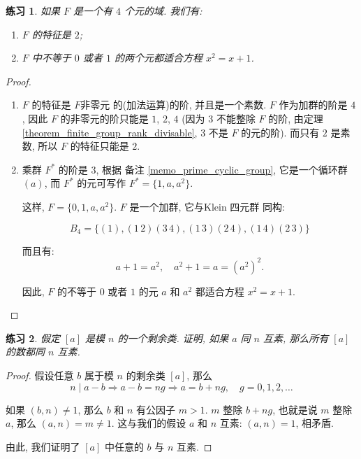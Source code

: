 \documentclass[utf8]{ctexbook}
\newtheorem{exercise}{练习}[section]
\begin{document}
\begin{exercise}
如果 $F$ 是一个有  $4$ 个元的域. 我们有:
\begin{enumerate}
\item{$F$ 的特征是 $2$;}
\item{$F$ 中不等于 $0$ 或者 $1$ 的两个元都适合方程 $x^2 = x + 1 $.}
\end{enumerate}
\end{exercise}

\begin{proof}
\begin{enumerate}
\item{$F$ 的特征是 $F$非零元 的(加法运算)的阶, 并且是一个素数. $F$ 作为加群的阶是 $4$, 因此 $F$ 的非零元的阶只能是 $1$, $2$, $4$ (因为 $3$ 不能整除 $F$ 的阶, 由定理 \ref{theorem_finite_group_rank_divisable}, $3$ 不是 $F$ 的元的阶). 而只有 $2$ 是素数, 所以 $F$ 的特征只能是 $2$.}
\item{乘群 $F^*$ 的阶是 $3$, 根据 备注 \ref{memo_prime_cyclic_group}, 它是一个循环群 $(a)$, 而 $F^*$ 的元可写作 $F^* = \{1, a, a^2 \}$.

这样, $F = \{0, 1, a, a^2 \}$. $F$ 是一个加群, 它与Klein 四元群 同构:

$$B_4 = \{ (1), (1\, 2)(3 \, 4), (1\, 3)(2 \, 4), (1\, 4) (2 \, 3) \} $$

而且有:
\begin{equation}
a + 1 = a^2, \quad a^2 + 1 = a = (a^2)^2.
\end{equation}

因此, $F$ 的不等于 $0$ 或者 $1$ 的元 $a$ 和 $a^2$ 都适合方程 $x^2 = x+ 1 $. 
}
\end{enumerate}
\end{proof}


\begin{exercise}
假定 $[a]$ 是模 $n$ 的一个剩余类. 证明, 如果 $a$ 同 $n$ 互素, 那么所有 $[a]$ 的数都同 $n$ 互素.
\end{exercise}

\begin{proof}
假设任意 $b$ 属于模 $n$ 的剩余类 $[a]$, 那么
\begin{equation}
n \mid a - b \Rightarrow  a - b = n g \Rightarrow a = b + n g , \quad g = 0, 1, 2, \ldots
\end{equation}

如果 $(b, n) \neq 1$, 那么 $b$ 和 $n$ 有公因子 $m > 1 $. $m$ 整除 $b +ng$, 也就是说 $m$ 整除 $a$, 那么 $(a, n ) = m \neq 1$. 这与我们的假设 $a$ 和 $n$ 互素: $(a,n) = 1$, 相矛盾. 

由此, 我们证明了 $[a]$ 中任意的 $b$ 与 $n$ 互素.

\end{proof}
\end{document}
